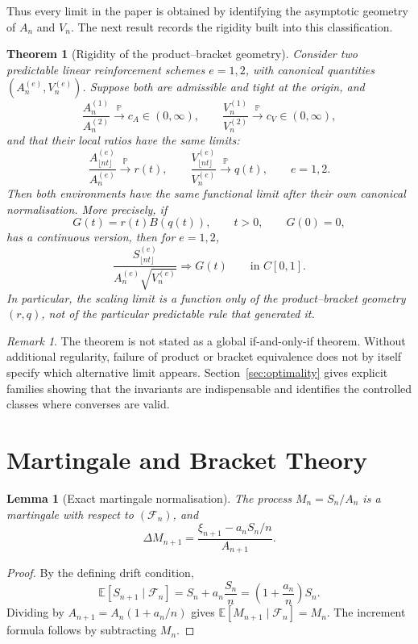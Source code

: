 \documentclass[11pt]{article}
\newtheorem{theorem}{Theorem}
\newtheorem{lemma}{Lemma}
\theoremstyle{definition}
\theoremstyle{remark}
\newtheorem{remark}{Remark}
\newcommand{\F}{\mathcal{F}}
\newcommand{\E}{\mathbb{E}}
\newcommand{\Pbb}{\mathbb{P}}
\newcommand{\1}{\mathbf{1}}
\begin{document}
Thus every limit in the paper is obtained by identifying the asymptotic geometry
of \(A_n\) and \(V_n\). The next result records the rigidity built into this
classification.

\begin{theorem}[Rigidity of the product--bracket geometry]\label{thm:rigidity}
Consider two predictable linear reinforcement schemes \(e=1,2\), with canonical
quantities \((A_n^{(e)},V_n^{(e)})\). Suppose both are admissible and tight at the origin,
and
\[
  \frac{A_n^{(1)}}{A_n^{(2)}}\xrightarrow{\Pbb} c_A\in(0,\infty),
  \qquad
  \frac{V_n^{(1)}}{V_n^{(2)}}\xrightarrow{\Pbb} c_V\in(0,\infty),
\]
and that their local ratios have the same limits:
\[
  \frac{A_{\lfloor nt\rfloor}^{(e)}}{A_n^{(e)}}\xrightarrow{\Pbb} r(t),
  \qquad
  \frac{V_{\lfloor nt\rfloor}^{(e)}}{V_n^{(e)}}\xrightarrow{\Pbb} q(t),
  \qquad e=1,2.
\]
Then both environments have the same functional limit after their own canonical
normalisation. More precisely, if
\[
  G(t)=r(t)B(q(t)),\qquad t>0,\qquad G(0)=0,
\]
has a continuous version, then for \(e=1,2\),
\[
  \frac{S_{\lfloor nt\rfloor}^{(e)}}{A_n^{(e)}\sqrt{V_n^{(e)}}}
  \Rightarrow G(t)
  \qquad\text{in }C[0,1].
\]
In particular, the scaling limit is a function only of the product--bracket
geometry \((r,q)\), not of the particular predictable rule that generated it.
\end{theorem}

\begin{remark}
The theorem is not stated as a global if-and-only-if theorem. Without additional
regularity, failure of product or bracket equivalence does not by itself specify
which alternative limit appears. Section~\ref{sec:optimality} gives explicit
families showing that the invariants are indispensable and identifies the
controlled classes where converses are valid.
\end{remark}

\section{Martingale and Bracket Theory}\label{sec:proofs}

\begin{lemma}[Exact martingale normalisation]\label{lem:martingale}
The process \(M_n=S_n/A_n\) is a martingale with respect to \((\F_n)\), and
\[
  \Delta M_{n+1}
  =
  \frac{\xi_{n+1}-a_nS_n/n}{A_{n+1}}.
\]
\end{lemma}

\begin{proof}
By the defining drift condition,
\[
  \E[S_{n+1}\mid\F_n]
  =S_n+a_n\frac{S_n}{n}
  =\left(1+\frac{a_n}{n}\right)S_n.
\]
Dividing by \(A_{n+1}=A_n(1+a_n/n)\) gives
\(\E[M_{n+1}\mid\F_n]=M_n\). The increment formula follows by subtracting
\(M_n\).
\end{proof}
\end{document}
